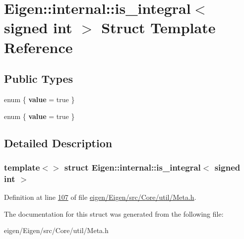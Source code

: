 \hypertarget{struct_eigen_1_1internal_1_1is__integral_3_01signed_01int_01_4}{}\section{Eigen\+:\+:internal\+:\+:is\+\_\+integral$<$ signed int $>$ Struct Template Reference}
\label{struct_eigen_1_1internal_1_1is__integral_3_01signed_01int_01_4}
\subsection*{Public Types}
\begin{DoxyCompactItemize}
\item 
\mbox{\label{struct_eigen_1_1internal_1_1is__integral_3_01signed_01int_01_4_a8efb8c79c6bf857a1e3a7961ec224ba1}} 
enum \{ {\bfseries value} = true
 \}
\item 
\mbox{\label{struct_eigen_1_1internal_1_1is__integral_3_01signed_01int_01_4_ac2d0c7eddd614918329f5e1c51bcf717}} 
enum \{ {\bfseries value} = true
 \}
\end{DoxyCompactItemize}


\subsection{Detailed Description}
\subsubsection*{template$<$$>$\newline
struct Eigen\+::internal\+::is\+\_\+integral$<$ signed int $>$}



Definition at line \hyperlink{eigen_2_eigen_2src_2_core_2util_2_meta_8h_source_l00107}{107} of file \hyperlink{eigen_2_eigen_2src_2_core_2util_2_meta_8h_source}{eigen/\+Eigen/src/\+Core/util/\+Meta.\+h}.



The documentation for this struct was generated from the following file\+:\begin{DoxyCompactItemize}
\item 
eigen/\+Eigen/src/\+Core/util/\+Meta.\+h\end{DoxyCompactItemize}
